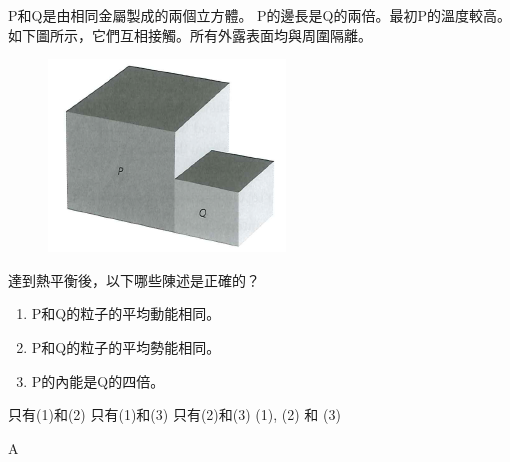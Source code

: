 {
    P和Q是由相同金屬製成的兩個立方體。 P的邊長是Q的兩倍。最初P的溫度較高。如下圖所示，它們互相接觸。所有外露表面均與周圍隔離。
    \begin{figure}[h]
        \centering
        \includegraphics[width=0.4\linewidth]{assets/MCQ2.png}
    \end{figure}
    \par 達到熱平衡後，以下哪些陳述是正確的？
    \medskip
    \begin{enumerate}[label=\sd]
        \item P和Q的粒子的平均動能相同。
        \item P和Q的粒子的平均勢能相同。
        \item P的內能是Q的四倍。
    \end{enumerate}
    \begin{choices}
        \CorrectChoice 只有(1)和(2)
        \choice 只有(1)和(3)
        \choice 只有(2)和(3)
        \choice (1), (2) 和 (3)
    \end{choices}
}{\mckey A}

